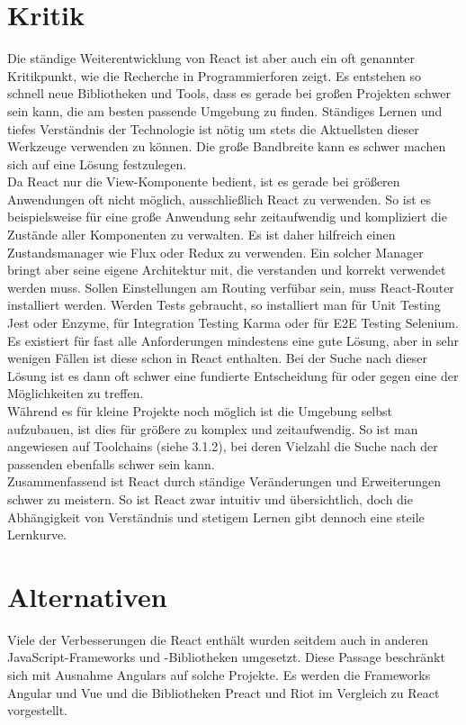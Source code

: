 \section{Kritik}
Die ständige Weiterentwicklung von React ist aber auch ein oft genannter Kritikpunkt, wie die Recherche in Programmierforen zeigt. Es entstehen so schnell neue Bibliotheken und Tools, dass es gerade bei großen Projekten schwer sein kann, die am besten passende Umgebung zu finden. Ständiges Lernen und tiefes Verständnis der Technologie ist nötig um stets die Aktuellsten dieser Werkzeuge verwenden zu können. Die große Bandbreite kann es schwer machen sich auf eine Lösung festzulegen. \\
Da React nur die View-Komponente bedient, ist es gerade bei größeren Anwendungen oft nicht möglich, ausschließlich React zu verwenden. So ist es beispielsweise für eine große Anwendung sehr zeitaufwendig und kompliziert die Zustände aller Komponenten zu verwalten. Es ist daher hilfreich einen Zustandsmanager wie Flux oder Redux zu verwenden. Ein solcher Manager bringt aber seine eigene Architektur mit, die verstanden und korrekt verwendet werden muss. Sollen Einstellungen am Routing verfübar sein, muss React-Router installiert werden. Werden Tests gebraucht, so installiert man für Unit Testing Jest oder Enzyme, für Integration Testing Karma oder für E2E Testing Selenium. Es existiert für fast alle Anforderungen mindestens eine gute Lösung, aber in sehr wenigen Fällen ist diese schon in React enthalten. Bei der Suche nach dieser Lösung ist es dann oft schwer eine fundierte Entscheidung für oder gegen eine der Möglichkeiten zu treffen. \\
Während es für kleine Projekte noch möglich ist die Umgebung selbst aufzubauen, ist dies für größere zu komplex und zeitaufwendig. So ist man angewiesen auf Toolchains (siehe 3.1.2), bei deren Vielzahl die Suche nach der passenden ebenfalls schwer sein kann. \\
Zusammenfassend ist React durch ständige Veränderungen und Erweiterungen schwer zu meistern. So ist React zwar intuitiv und übersichtlich, doch die Abhängigkeit von Verständnis und stetigem Lernen gibt dennoch eine steile Lernkurve. 

\section{Alternativen}
Viele der Verbesserungen die React enthält wurden seitdem auch in anderen JavaScript-Frameworks und -Bibliotheken umgesetzt. Diese Passage beschränkt sich mit Ausnahme Angulars auf solche Projekte. Es werden die Frameworks Angular und Vue und die Bibliotheken Preact und Riot im Vergleich zu React vorgestellt.\\
